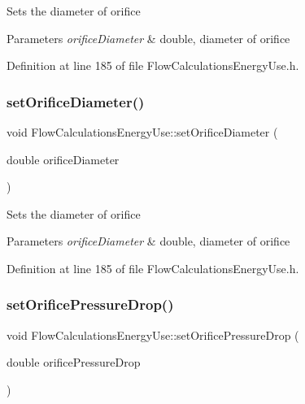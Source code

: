 Sets the diameter of orifice


\begin{DoxyParams}{Parameters}
{\em orifice\+Diameter} & double, diameter of orifice \\
\hline
\end{DoxyParams}


Definition at line 185 of file Flow\+Calculations\+Energy\+Use.\+h.

\mbox{\label{class_flow_calculations_energy_use_a31116dc6381ad3fd9d2214da7ee3dd1b}} 
\subsubsection{\texorpdfstring{set\+Orifice\+Diameter()}{setOrificeDiameter()}\hspace{0.1cm}{\footnotesize\ttfamily [3/3]}}
{\footnotesize\ttfamily void Flow\+Calculations\+Energy\+Use\+::set\+Orifice\+Diameter (\begin{DoxyParamCaption}\item[{double}]{orifice\+Diameter }\end{DoxyParamCaption})\hspace{0.3cm}{\ttfamily [inline]}}

Sets the diameter of orifice


\begin{DoxyParams}{Parameters}
{\em orifice\+Diameter} & double, diameter of orifice \\
\hline
\end{DoxyParams}


Definition at line 185 of file Flow\+Calculations\+Energy\+Use.\+h.

\mbox{\label{class_flow_calculations_energy_use_ad4b324ecd8288d44c32d622bb26b1bff}} 
\subsubsection{\texorpdfstring{set\+Orifice\+Pressure\+Drop()}{setOrificePressureDrop()}\hspace{0.1cm}{\footnotesize\ttfamily [1/3]}}
{\footnotesize\ttfamily void Flow\+Calculations\+Energy\+Use\+::set\+Orifice\+Pressure\+Drop (\begin{DoxyParamCaption}\item[{double}]{orifice\+Pressure\+Drop }\end{DoxyParamCaption})\hspace{0.3cm}{\ttfamily [inline]}}

